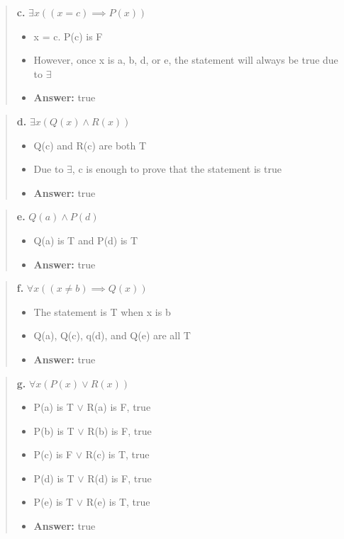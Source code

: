\documentclass[11pt, oneside]{article}
\begin{document}
\begin{quote}
    \textbf{c. }$\exists x ((x = c) \implies P(x))$

    \begin{itemize}
        \item x = c. P(c) is F
        \item However, once x is a, b, d, or e, the statement will always be true due to $\exists$
        \item \textbf{Answer:} true
    \end{itemize}
\end{quote}

\begin{quote}
    \textbf{d. }$\exists x (Q(x) \land R(x))$

    \begin{itemize}
        \item Q(c) and R(c) are both T
        \item Due to $\exists$, c is enough to prove that the statement is true
        \item \textbf{Answer:} true
    \end{itemize}
\end{quote}

\begin{quote}
    \textbf{e. }$Q(a) \land P(d)$

    \begin{itemize}
        \item Q(a) is T and P(d) is T 
        \item \textbf{Answer:} true
    \end{itemize}
\end{quote}

\begin{quote}
    \textbf{f. }$\forall x ((x \ne b ) \implies Q(x))$

    \begin{itemize}
        \item The statement is T when x is b
        \item Q(a), Q(c), q(d), and Q(e) are all T
        \item \textbf{Answer:} true
    \end{itemize}
\end{quote}

\begin{quote}
    \textbf{g. }$\forall x (P(x) \lor R(x))$

    \begin{itemize}
        \item P(a) is T $\lor$ R(a) is F, true
        \item P(b) is T $\lor$ R(b) is F, true
        \item P(c) is F $\lor$ R(c) is T, true
        \item P(d) is T $\lor$ R(d) is F, true
        \item P(e) is T $\lor$ R(e) is T, true
        \item \textbf{Answer:} true
    \end{itemize}
\end{quote}
\end{document}
